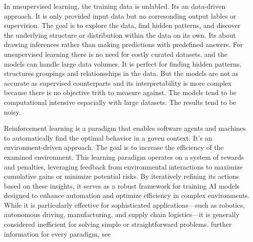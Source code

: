 In unsupervised learning, the training data is unlabled. 
Its an data-driven approach.
It is only provided input data but no corresonding output lables or supervision.
The goal is to explore the data, find hidden patterns, and discover the underlying structure or distribution within the data on its own.
Its about drawing inferences rather than making predictions with predefined answers.
For unsupervised learning there is no need for costly curated datasets, and the models can handle large data volumes.
It is perfect for finding hidden patterns, structures groupings and relationsships in the data.
But the models are not as accurate as supervised counterparts and its interpretability is more complex because there is no objective trith to measure against.
The models tend to be computational intensive espacially with large datasets. The results tend to be noisy.
\cite[p.4]{sarker2021machine}


Reinforcement learning is a paradigm that enables software agents and machines to automatically find the optimal behavior in a goven context.
It's an environment-driven approach.
The goal is to increase the efficiency of the examined environment. 
This learning paradigm operates on a system of rewards and penalties, leveraging feedback from environmental interactions to maximize cumulative gains or minimize potential risks. 
By iteratively refining its actions based on these insights, it serves as a robust framework for training AI models designed to enhance automation and optimize efficiency in complex environments. 
While it is particularly effective for sophisticated applications—such as robotics, autonomous driving, manufacturing, and supply chain logistics—it is generally considered inefficient for solving simple or straightforward problems.
\citep[p.4]{sarker2021machine}
further information for every paradigm, see \citep{emmert2022taxonomy}



